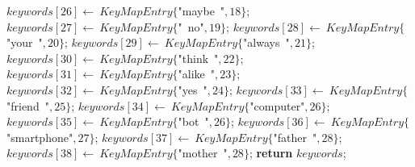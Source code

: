 \documentclass[a4paper,10pt]{article}
\begin{document}
\begin{algorithm}
\begin{algorithmic}[5]
  \State \(keywords[26]\gets\ KeyMapEntry\{\)"{}maybe\ "{}\(,18\}\);
  \State \(keywords[27]\gets\ KeyMapEntry\{\)"{}\ no"{}\(,19\}\);
  \State \(keywords[28]\gets\ KeyMapEntry\{\)"{}your\ "{}\(,20\}\);
  \State \(keywords[29]\gets\ KeyMapEntry\{\)"{}always\ "{}\(,21\}\);
  \State \(keywords[30]\gets\ KeyMapEntry\{\)"{}think\ "{}\(,22\}\);
  \State \(keywords[31]\gets\ KeyMapEntry\{\)"{}alike\ "{}\(,23\}\);
  \State \(keywords[32]\gets\ KeyMapEntry\{\)"{}yes\ "{}\(,24\}\);
  \State \(keywords[33]\gets\ KeyMapEntry\{\)"{}friend\ "{}\(,25\}\);
  \State \(keywords[34]\gets\ KeyMapEntry\{\)"{}computer"{}\(,26\}\);
  \State \(keywords[35]\gets\ KeyMapEntry\{\)"{}bot\ "{}\(,26\}\);
  \State \(keywords[36]\gets\ KeyMapEntry\{\)"{}smartphone"{}\(,27\}\);
  \State \(keywords[37]\gets\ KeyMapEntry\{\)"{}father\ "{}\(,28\}\);
  \State \(keywords[38]\gets\ KeyMapEntry\{\)"{}mother\ "{}\(,28\}\);
  \State \textbf{return} \(keywords\);
\EndFunction
\end{algorithmic}
\end{algorithm}
\end{document}
